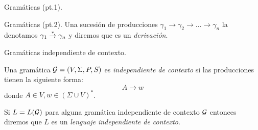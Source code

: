 \documentclass[aspectratio=169, 11pt]{beamer}
\begin{document}
	\begin{frame}[fragile]{Gramáticas (pt.1).}
		
	\end{frame}
	
	\begin{frame}[fragile]{Gramáticas (pt.2).}
		Una sucesión de producciones $\gamma_{1} \to \gamma_{2} \to \dots \to \gamma_{n}$ la denotamos $\gamma_{1} \overset{*}{\to} \gamma_{n}$ y diremos que es un \emph{derivación}.
		\medskip 

	\end{frame}

	\begin{frame}{Gramáticas independiente de contexto.}
		\begin{deff}
			Una gramática ${\cal G} = (V, \Sigma, P, S) $ es \emph{independiente de contexto} si las producciones tienen la siguiente forma:
			\begin{equation*}
				A \to w
			\end{equation*}
			donde $A \in V, w \in (\Sigma \cup V)^*$.  
			
			Si $L=L({\cal G})$ para alguna gramática independiente de contexto $\cal G$ entonces diremos que $L$ es un \emph{lenguaje independiente de contexto}.

		\end{deff}
	\end{frame}
\end{document}
